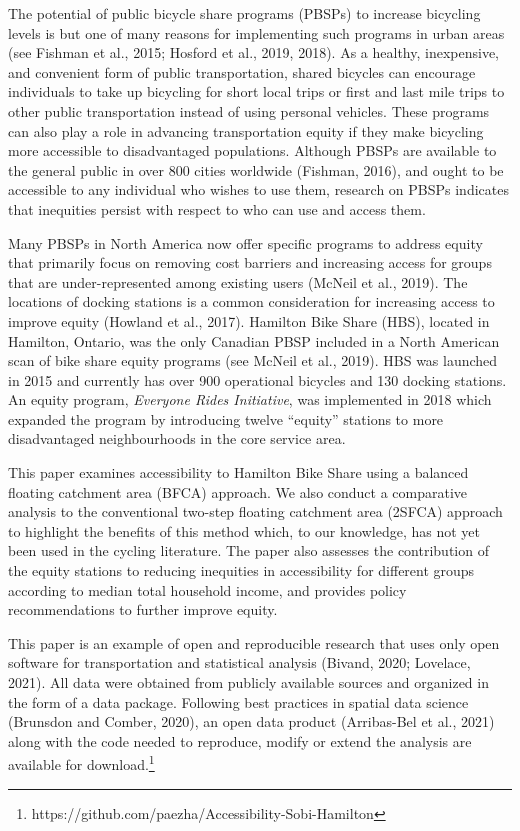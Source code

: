 \documentclass[]{elsarticle} %
\begin{document}
The potential of public bicycle share programs (PBSPs) to increase
bicycling levels is but one of many reasons for implementing such
programs in urban areas (see Fishman et al., 2015; Hosford et al., 2019,
2018). As a healthy, inexpensive, and convenient form of public
transportation, shared bicycles can encourage individuals to take up
bicycling for short local trips or first and last mile trips to other
public transportation instead of using personal vehicles. These programs
can also play a role in advancing transportation equity if they make
bicycling more accessible to disadvantaged populations. Although PBSPs
are available to the general public in over 800 cities worldwide
(Fishman, 2016), and ought to be accessible to any individual who wishes
to use them, research on PBSPs indicates that inequities persist with
respect to who can use and access them.

Many PBSPs in North America now offer specific programs to address
equity that primarily focus on removing cost barriers and increasing
access for groups that are under-represented among existing users
(McNeil et al., 2019). The locations of docking stations is a common
consideration for increasing access to improve equity (Howland et al.,
2017). Hamilton Bike Share (HBS), located in Hamilton, Ontario, was the
only Canadian PBSP included in a North American scan of bike share
equity programs (see McNeil et al., 2019). HBS was launched in 2015 and
currently has over 900 operational bicycles and 130 docking stations. An
equity program, \emph{Everyone Rides Initiative}, was implemented in
2018 which expanded the program by introducing twelve ``equity''
stations to more disadvantaged neighbourhoods in the core service area.

This paper examines accessibility to Hamilton Bike Share using a
balanced floating catchment area (BFCA) approach. We also conduct a
comparative analysis to the conventional two-step floating catchment
area (2SFCA) approach to highlight the benefits of this method which, to
our knowledge, has not yet been used in the cycling literature. The
paper also assesses the contribution of the equity stations to reducing
inequities in accessibility for different groups according to median
total household income, and provides policy recommendations to further
improve equity.

This paper is an example of open and reproducible research that uses
only open software for transportation and statistical analysis (Bivand,
2020; Lovelace, 2021). All data were obtained from publicly available
sources and organized in the form of a data package. Following best
practices in spatial data science (Brunsdon and Comber, 2020), an open
data product (Arribas-Bel et al., 2021) along with the code needed to
reproduce, modify or extend the analysis are available for
download.\footnote{https://github.com/paezha/Accessibility-Sobi-Hamilton}
\end{document}
